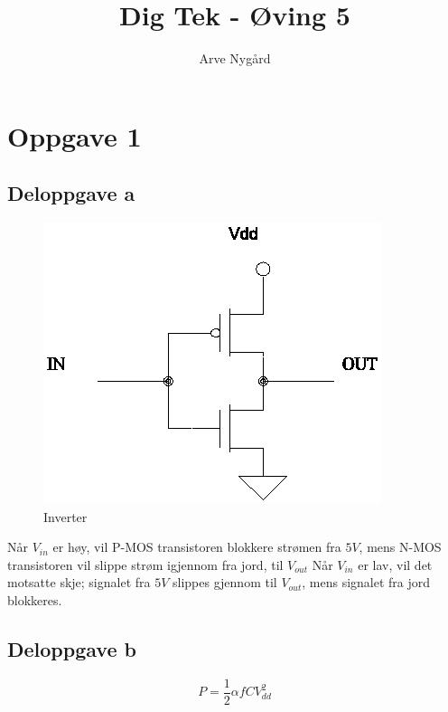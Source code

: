 \documentclass[12pt,norsk,a4paper]{article}
\begin{document}
\title{Dig Tek - Øving 5}
\author {Arve Nygård}

\maketitle

\clearpage

\section{Oppgave 1}

\subsection{Deloppgave a}

\begin{figure}[H]
\begin{center}
\includegraphics[scale=0.5]{inverter.png}
\caption{Inverter}
\end{center}
\label{fig:ideellgraf}
\end{figure}


Når $V_{in}$ er høy, vil P-MOS transistoren blokkere strømen fra $5V$, mens N-MOS transistoren vil slippe strøm igjennom fra jord, til $V_{out}$
Når $V_{in}$ er lav, vil det motsatte skje; signalet fra $5V$ slippes gjennom til $V_{out}$, mens signalet fra jord blokkeres.


\subsection{Deloppgave b}
\begin{equation}
P = \frac{1}{2} \alpha f C V_{dd}^2
\end{equation}
\end{document}
